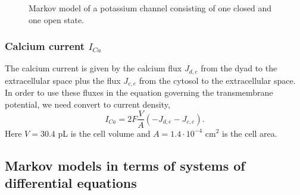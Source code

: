 \begin{figure}[ptb]
\begin{center}
\end{center}
\caption{Markov model of a potassium channel
consisting of one closed and one open state. }%
\label{K1}%
\end{figure}


\subsubsection{Calcium current $I_{Ca}$}

The calcium current is given by the calcium flux  $J_{d,e}$ from the dyad to the extracellular space plus the flux $J_{c,e}$ from the cytosol to the extracellular space.
In order to use these fluxes  in the equation governing the transmembrane potential, we need convert to current density,
\begin{equation}
I_{Ca}= 2 F\frac{V}{A} (-J_{d,e}-J_{c,e}).   \label{I_Ca}
\end{equation}
Here $V=30.4$ pL is the cell volume and $A=1.4\cdot 10^{-4} \text{ cm}^2$ is the cell area.

\subsection[Markov models as ODEs]{Markov models in terms of systems of differential equations}

